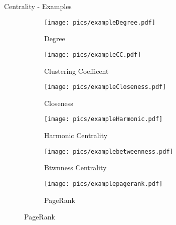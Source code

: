 \begin{textbox}{Centrality - Examples}
    \begin{figure}[H]
        \begin{subfigure}{.5\textwidth}
            \texttt{[image: pics/exampleDegree.pdf]}
            \caption{Degree}
        \end{subfigure}
        \begin{subfigure}{.5\textwidth}
            \texttt{[image: pics/exampleCC.pdf]}
            \caption{Clustering Coefficent}
        \end{subfigure}

        \begin{subfigure}{.5\textwidth}
            \texttt{[image: pics/exampleCloseness.pdf]}
            \caption{Closeness}
        \end{subfigure}
        \begin{subfigure}{.5\textwidth}
            \texttt{[image: pics/exampleHarmonic.pdf]}
            \caption{Harmonic Centrality}
        \end{subfigure}
        \begin{subfigure}{.5\textwidth}
            \texttt{[image: pics/examplebetweenness.pdf]}
            \caption{Btwnness Centrality}
        \end{subfigure}
        \begin{subfigure}{.5\textwidth}
            \texttt{[image: pics/examplepagerank.pdf]}
            \caption{PageRank}
        \end{subfigure}
    \end{figure}
\end{textbox}




